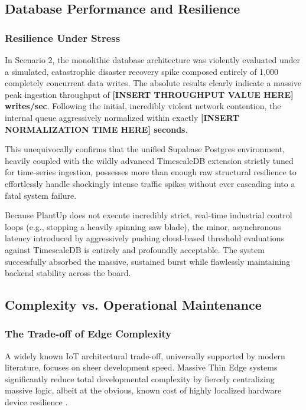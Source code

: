 \subsection{Database Performance and Resilience}

\subsubsection{Resilience Under Stress}

In Scenario 2, the monolithic database architecture was violently evaluated under a simulated, catastrophic disaster recovery spike composed entirely of 1,000 completely concurrent data writes. The absolute results clearly indicate a massive peak ingestion throughput of \textbf{[INSERT THROUGHPUT VALUE HERE] writes/sec}. Following the initial, incredibly violent network contention, the internal queue aggressively normalized within exactly \textbf{[INSERT NORMALIZATION TIME HERE] seconds}. 

This unequivocally confirms that the unified Supabase Postgres environment, heavily coupled with the wildly advanced TimescaleDB extension strictly tuned for time-series ingestion, possesses more than enough raw structural resilience to effortlessly handle shockingly intense traffic spikes without ever cascading into a fatal system failure. 

Because PlantUp does not execute incredibly strict, real-time industrial control loops (e.g., stopping a heavily spinning saw blade), the minor, asynchronous latency introduced by aggressively pushing cloud-based threshold evaluations against TimescaleDB is entirely and profoundly acceptable. The system successfully absorbed the massive, sustained burst while flawlessly maintaining backend stability across the board.

\subsection{Complexity vs. Operational Maintenance}

\subsubsection{The Trade-off of Edge Complexity}

A widely known IoT architectural trade-off, universally supported by modern literature, focuses on sheer development speed. Massive Thin Edge systems significantly reduce total developmental complexity by fiercely centralizing massive logic, albeit at the obvious, known cost of highly localized hardware device resilience \cite{zeetimThickThin, outsourceThinThick, deepwikiSupabase}. 

